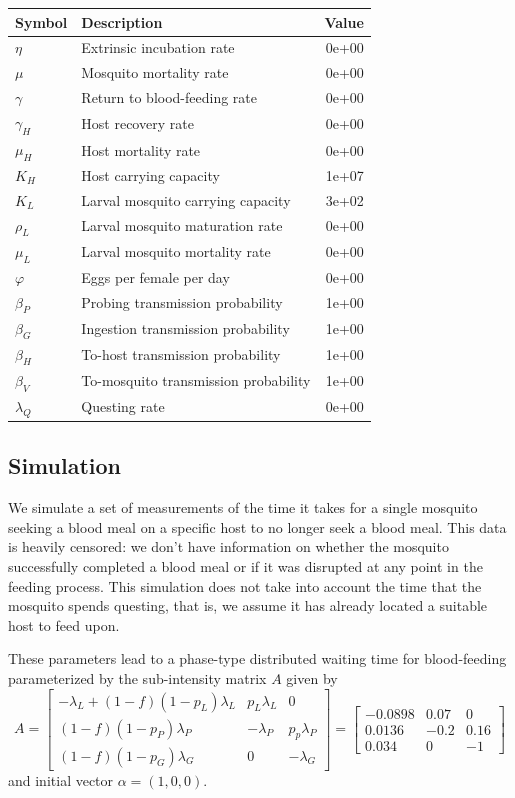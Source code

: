 \documentclass[
]{article}
\begin{document}
\begin{longtable}[]{@{}llr@{}}
\toprule\noalign{}
Symbol & Description & Value \\
\midrule\noalign{}
\endhead
\bottomrule\noalign{}
\endlastfoot
\(\eta\) & Extrinsic incubation rate & 0e+00 \\
\(\mu\) & Mosquito mortality rate & 0e+00 \\
\(\gamma\) & Return to blood-feeding rate & 0e+00 \\
\(\gamma_H\) & Host recovery rate & 0e+00 \\
\(\mu_H\) & Host mortality rate & 0e+00 \\
\(K_H\) & Host carrying capacity & 1e+07 \\
\(K_L\) & Larval mosquito carrying capacity & 3e+02 \\
\(\rho_L\) & Larval mosquito maturation rate & 0e+00 \\
\(\mu_L\) & Larval mosquito mortality rate & 0e+00 \\
\(\varphi\) & Eggs per female per day & 0e+00 \\
\(\beta_P\) & Probing transmission probability & 1e+00 \\
\(\beta_G\) & Ingestion transmission probability & 1e+00 \\
\(\beta_H\) & To-host transmission probability & 1e+00 \\
\(\beta_V\) & To-mosquito transmission probability & 1e+00 \\
\(\lambda_Q\) & Questing rate & 0e+00 \\
\end{longtable}

\subsection{Simulation}\label{simulation}

We simulate a set of measurements of the time it takes for a single
mosquito seeking a blood meal on a specific host to no longer seek a
blood meal. This data is heavily censored: we don't have information on
whether the mosquito successfully completed a blood meal or if it was
disrupted at any point in the feeding process. This simulation does not
take into account the time that the mosquito spends questing, that is,
we assume it has already located a suitable host to feed upon.

These parameters lead to a phase-type distributed waiting time for
blood-feeding parameterized by the sub-intensity matrix \(A\) given by
\[
A = \begin{bmatrix}-\lambda_{L}+\left(1-f\right)\left(1-p_{L}\right)\lambda_{L} & p_{L}\lambda_{L} & 0\\
\left(1-f\right)\left(1-p_{P}\right)\lambda_{P} & -\lambda_{P} & p_{p}\lambda_{P}\\
\left(1-f\right)\left(1-p_{G}\right)\lambda_{G} & 0 & -\lambda_{G}
\end{bmatrix}  = \begin{bmatrix} -0.0898 & 0.07 & 0\\
0.0136 & -0.2 & 0.16\\
0.034 & 0 & -1
\end{bmatrix}
\] and initial vector \(\alpha = \left(1,0,0\right)\).
\end{document}
